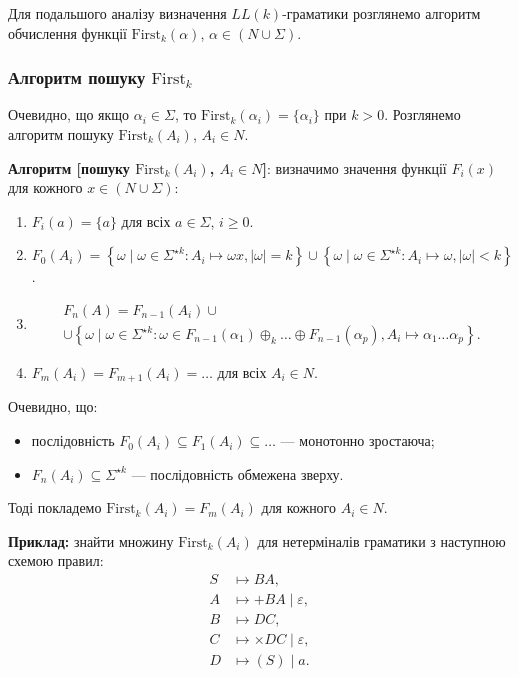 Для подальшого аналізу визначення $LL(k)$-граматики розглянемо алгоритм обчислення функції $\text{First}_k (\alpha)$, $\alpha \in (N \cup \Sigma)$.

\subsubsection{Алгоритм пошуку $\text{First}_k$}

Очевидно, що якщо $\alpha_i \in \Sigma$, то $\text{First}_k (\alpha_i) = \{\alpha_i\}$ при $k > 0$. Розглянемо алгоритм пошуку $\text{First}_k (A_i)$, $A_i \in N$.\medskip

\textbf{Алгоритм [пошуку $\text{First}_k(A_i)$, $A_i \in N$]}: визначимо значення функції $F_i(x)$ для кожного $x \in (N \cup \Sigma)$: 
\begin{enumerate}
	\item $F_i (a) = \{a\}$ для всіх $a \in \Sigma$, $i \ge 0$.
	\item $F_0(A_i) = \left\{ \omega \mid \omega \in \Sigma^{\star k}: A_i \mapsto \omega x, \vert\omega\vert = k \right\} \cup \left\{ \omega \mid \omega \in \Sigma^{\star k}: A_i \mapsto \omega, \vert\omega\vert < k \right\}$.
	\item \begin{multline*}
		F_n(A) = F_{n - 1}(A_i) \cup \\
		\cup\left\{ \omega \mid \omega \in \Sigma^{\star k}: \omega \in F_{n - 1} (\alpha_1) \oplus_k \ldots \oplus F_{n - 1} (\alpha_p), A_i \mapsto \alpha_1 \ldots \alpha_p \right\}.
	\end{multline*}
	\item $F_m(A_i) = F_{m + 1}(A_i) = \ldots$ для всіх $A_i \in N$.
\end{enumerate}

Очевидно, що:
\begin{itemize}
	\item послідовність $F_0 (A_i) \subseteq F_1(A_i) \subseteq \ldots$ --- монотонно зростаюча;
	\item $F_n(A_i) \subseteq \Sigma^{\star k}$ --- послідовність обмежена зверху.
\end{itemize}

Тоді покладемо $\text{First}_k(A_i) = F_m(A_i)$ для кожного $A_i \in N$.

\textbf{Приклад:} знайти множину $\text{First}_k (A_i)$ для нетерміналів граматики з наступною схемою правил: 
\begin{align*}
	S &\mapsto BA, \\
	A &\mapsto +BA \mid \varepsilon, \\
	B &\mapsto DC, \\
	C &\mapsto \times DC \mid \varepsilon, \\
	D &\mapsto (S) \mid a.
\end{align*}

